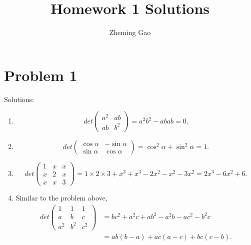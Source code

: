 \documentclass[12pt]{article}
\begin{document}
 
 
\title{Homework 1 Solutions}
\author{Zheming Gao}
\maketitle

\section{Problem 1}

Solutions: 
\begin{enumerate}
\item 
\begin{equation*}
det
\begin{pmatrix}
a^2 & ab \\
ab & b^2
\end{pmatrix}
= a^2b^2 - abab = 0.
\end{equation*}

\item
\begin{equation*}
det
\begin{pmatrix}
\cos\alpha & -\sin\alpha \\
\sin\alpha & \cos\alpha
\end{pmatrix}
= \cos^2\alpha + \sin^2\alpha = 1.
\end{equation*}

\item
\begin{equation*}
det
\begin{pmatrix}
1 & x & x \\
x & 2 & x \\
x & x & 3
\end{pmatrix}
= 1\times 2 \times 3 + x^3 + x^3 - 2x^2 - x^2 - 3x^2 = 
2x^3 - 6x^2 + 6.
\end{equation*}

\item
Similar to the problem above, 
\begin{equation*}
\begin{aligned}
det
\begin{pmatrix}
1 & 1 & 1 \\
a & b & c \\
a^2 & b^2 & c^2
\end{pmatrix}
& = bc^2 + a^2c + ab^2 - a^2b - ac^2 - b^2c \\
& = ab(b-a) + ac(a-c) + bc(c-b).
\end{aligned}
\end{equation*}


\end{enumerate}
\end{document}
